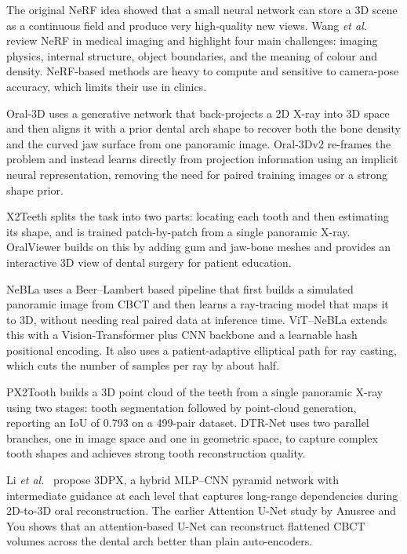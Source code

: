 \documentclass[conference]{IEEEtran}
\begin{document}
The original NeRF idea \cite{mildenhall2021nerf} showed that a small neural network can store a 3D scene as a continuous field and produce very high-quality new views. Wang \emph{et al.}\ \cite{wang2024neural} review NeRF in medical imaging and highlight four main challenges: imaging physics, internal structure, object boundaries, and the meaning of colour and density. NeRF-based methods are heavy to compute and sensitive to camera-pose accuracy, which limits their use in clinics.

Oral-3D \cite{song2021oral} uses a generative network that back-projects a 2D X-ray into 3D space and then aligns it with a prior dental arch shape to recover both the bone density and the curved jaw surface from one panoramic image. Oral-3Dv2 \cite{song2023oral} re-frames the problem and instead learns directly from projection information using an implicit neural representation, removing the need for paired training images or a strong shape prior.

X2Teeth \cite{liang2020x2teeth} splits the task into two parts: locating each tooth and then estimating its shape, and is trained patch-by-patch from a single panoramic X-ray. OralViewer \cite{liang2021oralviewer} builds on this by adding gum and jaw-bone meshes and provides an interactive 3D view of dental surgery for patient education.

NeBLa \cite{park2024nebla} uses a Beer--Lambert based pipeline that first builds a simulated panoramic image from CBCT and then learns a ray-tracing model that maps it to 3D, without needing real paired data at inference time. ViT--NeBLa \cite{parida2025vit} extends this with a Vision-Transformer plus CNN backbone and a learnable hash positional encoding. It also uses a patient-adaptive elliptical path for ray casting, which cuts the number of samples per ray by about half.

PX2Tooth \cite{ma2024px2tooth} builds a 3D point cloud of the teeth from a single panoramic X-ray using two stages: tooth segmentation followed by point-cloud generation, reporting an IoU of 0.793 on a 499-pair dataset. DTR-Net \cite{mei2023dtr} uses two parallel branches, one in image space and one in geometric space, to capture complex tooth shapes and achieves strong tooth reconstruction quality.

Li \emph{et al.}\ \cite{li20243dpx} propose 3DPX, a hybrid MLP--CNN pyramid network with intermediate guidance at each level that captures long-range dependencies during 2D-to-3D oral reconstruction. The earlier Attention U-Net study by Anusree and You \cite{anusree2023deep} shows that an attention-based U-Net can reconstruct flattened CBCT volumes across the dental arch better than plain auto-encoders.
\end{document}
